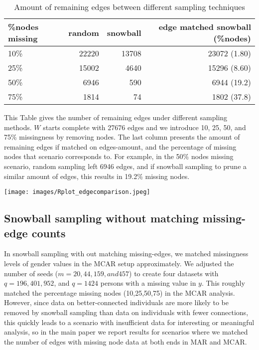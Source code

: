 \documentclass{article}
\begin{document}
\begin{table}
	\centering
	\caption{Amount of remaining edges between different sampling techniques}
	\label{tab:edgecomparison}
	\begin{tabular}{lrrr}
		\%nodes missing	& random& snowball  & edge matched snowball (\%nodes) \\ \hline
		    10\% 		& 22220 & 13708     & 23072 (1.80) \\
		    25\%		& 15002 &  4640     & 15296 (8.60) \\
		    50\%		& 6946  &   590     &  6944 (19.2) \\
		    75\% 		& 1814  &    74     &  1802 (37.8) \\ \hline
	\end{tabular}
	\raggedright This Table gives the number of remaining edges under different sampling methods. $W$ starts complete with 27676 edges and we introduce 10, 25, 50, and 75\% missingness by removing nodes. The last column presents the amount of remaining edges if matched on edges-amount, and the percentage of missing nodes that scenario corresponds to. For example, in the 50\% nodes missing scenario, random sampling left 6946 edges, and if snowball sampling to prune a similar amount of edges, this results in 19.2\% missing nodes.
\end{table}


\begin{center}
    \texttt{[image: images/Rplot\_edgecomparison.jpeg]}
    \label{fig:edgecomparison}
\end{center}

\subsection{Snowball sampling without matching missing-edge counts} \label{sec:snowballall} 
In snowball sampling with out matching missing-edges, we matched missingness levels of gender values in the MCAR setup approximately. We adjusted the number of seeds ($m=20, 44, 159, and 457$) to create four datasets with $q=196, 401, 952$, and $q=1424$ persons with a missing value in $y$. This roughly matched the percentage missing nodes (10,25,50,75)
in the MCAR analysis.  However, since data on better-connected individuals are more likely to be removed by snowball sampling than data on individuals 
with fewer connections, this quickly leads to a scenario with insufficient data for interesting or meaningful analysis, so in the main paper we report
results for scenarios where we matched the number of edges with missing node data at both ends in MAR and MCAR. 
\end{document}
